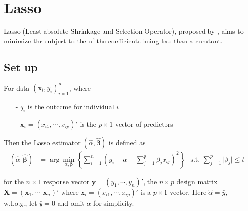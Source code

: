 \documentclass[twoside]{article}
\begin{document}

\section{Lasso}
Lasso (Least absolute Shrinkage and Selection Operator), proposed by \citet{tibshirani1996regression}, aims to minimize the  subject to the  of the coefficients being less than a constant.

\subsection{Set up}
For data $\left(\mathbf{x}_i,y_i\right)^n_{i=1}$, where
\begin{itemize}
    \item[-] $y_i$ is the outcome for individual $i$
    \item[-] $\mathbf{x}_i = \left(x_{i1},\cdots,x_{ip}\right)'$ is the $p\times 1$ vector of predictors
\end{itemize}
Then the Lasso estimator $\left(\hat{\alpha},\hat{\boldsymbol{\beta}}\right)$ is defined as 
\begin{align*}
    \left(\hat{\alpha},\hat{\boldsymbol{\beta}}\right) &= \arg\min_{\alpha,\boldsymbol{\beta}}\left\{ \sum^n_{i=1}\left(y_i-\alpha-\sum^p_{j=1}\beta_jx_{ij}\right)^2 \right\} & \text{s.t. }\sum^p_{j=1}\lvert \beta_j \rvert\leq t
\end{align*}

for the $n\times 1$ response vector $\mathbf{y}=\left( y_1,\cdots,y_n \right)'$, the $n\times p$ design matrix $\mathbf{X}=\left(\mathbf{x}_1,\cdots,\mathbf{x}_n\right)'$ where $\mathbf{x}_i= \left( x_{i1},\cdots,x_{ip} \right)' $ is a $p\times 1$ vector. Here $\hat{\alpha}=\bar{y}$, w.l.o.g., let $\bar{y}=0$ and omit $\alpha$ for simplicity.
\end{document}
